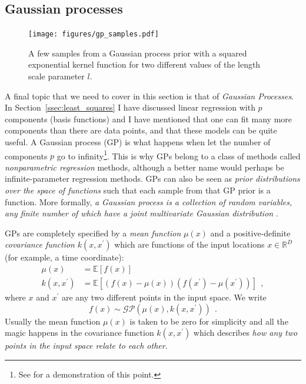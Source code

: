 \documentclass[12pt,dvipsnames]{report}
\newcommand{\hquad}{~~}
\begin{document}
\subsection{Gaussian processes}
\begin{figure}[t]
    \begin{centering}
        \texttt{[image: figures/gp\_samples.pdf]}
        \caption{A few samples from a Gaussian process prior with a squared exponential
            kernel function for two different values of the length scale parameter $l$.}
        \label{fig:gp_samples}
    \end{centering}
\end{figure}
A final topic that we need to cover in this section is that of \emph{Gaussian
    Processes}. In Section~\ref{ssec:least_squares} I have discussed linear
regression with $p$ components (basis functions) and I have mentioned that one can
fit many more components than there are data points, and that these models can
be quite useful. A Gaussian process (GP) is what happens when let the number of
components $p$ go to infinity\footnote{See \citet{arXiv:2101.07256} for a
    demonstration of this point.}. This is why GPs belong to a class of methods
called \emph{nonparametric regression} methods, although a better name would
perhaps be infinite-parameter regression methods. 
GPs can also be seen as \emph{prior distributions over the
    space of functions} such that each sample from that GP prior is a function.
More formally, \emph{a Gaussian process is a collection of random variables,
    any finite number of which have a joint multivariate Gaussian
    distribution} \citep{rasmussen2006}.

GPs are completely specified by a \emph{mean function} $\mu (x)$ and a
positive-definite \emph{covariance function} $k(x,x^\prime)$ which are
functions of the input locations $x\in \mathbb{R}^D$ (for example, a time
coordinate):
\begin{align}
    \mu (x)        & =\mathbb{E}[f(x)]                                                    \\
    k(x, x^\prime) & =\mathbb{E}\left[(f(x) -\mu (x))(f(x^\prime) -\mu (x^\prime))\right]
    \hquad,
\end{align}
where $x$ and $x^\prime$ are any two different points in the input space.
We write
\begin{equation}
    f(x) \sim \mathcal{G} \mathcal{P}\left(\mu(x), k\left(x, x^{\prime}\right)\right)
    \hquad.
\end{equation}
Usually the mean function $\mu(x)$  is taken to be zero for simplicity and all the
magic happens in the covariance function $k(x,x^\prime)$ which describes
\emph{how  any two points in the input space relate to each other}.
\end{document}
